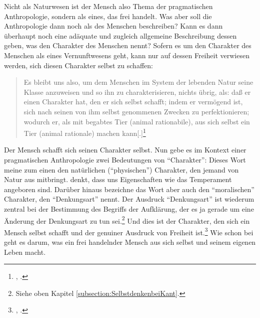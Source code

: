 Nicht als Naturwesen ist der Mensch also Thema der pragmatischen Anthropologie,
sondern als eines, das frei handelt. Was aber soll die Anthropologie dann noch
als  des Menschen beschreiben? Kann es dann überhaupt noch eine
adäquate und zugleich allgemeine Beschreibung dessen geben, was
 den Charakter des Menschen nennt? Sofern es um den
Charakter des Menschen als eines Vernunftwesens geht, kann nur auf dessen
Freiheit verwiesen werden, sich diesen Charakter selbst zu schaffen:
\begin{quote} 
  Es bleibt uns also, um dem Menschen im System der lebenden Natur seine Klasse
  anzuweisen und so ihn zu charakterisieren, nichts übrig, als: daß er einen
  Charakter hat, den er sich selbst schafft; indem er vermögend ist, sich nach
  seinen von ihm selbst genommenen Zwecken zu perfektionieren; wodurch er, als
  mit  begabtes Tier (animal rationabile), aus sich
  selbst ein  Tier (animal rationale) machen
  kann[.]\footnote{\cite[A~315]{Kant:AnthropologieinpragmatischerHinsicht1977},
  \cite[VII: 321.29--35]{Kant:GesammelteWerke1900ff.}.}
\end{quote}
Der Mensch schafft sich seinen Charakter selbst. Nun gebe es im Kontext
einer pragmatischen Anthropologie zwei Bedeutungen von \enquote{Charakter}:
Dieses Wort meine zum einen den natürlichen (\enquote{physischen}) Charakter,
den jemand von Natur aus mitbringt.  denkt, dass uns
Eigenschaften wie das Temperament angeboren sind. Darüber hinaus bezeichne das
Wort aber auch den \enquote{moralischen} Charakter, den 
\enquote{Denkungsart} nennt. Der Ausdruck \enquote{Denkungsart} ist wiederum
zentral bei der Bestimmung des Begriffs der Aufklärung, der es ja gerade um eine
Änderung der Denkungsart zu tun sei.\footnote{Siehe oben Kapitel
\ref{subsection:SelbstdenkenbeiKant}.} Und dies ist der Charakter, den sich ein
Mensch selbst schafft und der genuiner Ausdruck von Freiheit
ist.\footnote{\cite[Vgl.][A~255-6]{Kant:AnthropologieinpragmatischerHinsicht1977},
\cite[VII: 285.6-21]{Kant:GesammelteWerke1900ff.}.} Wie schon bei
 geht es
darum, was ein frei handelnder Mensch aus sich selbst und seinem eigenen Leben
macht.

